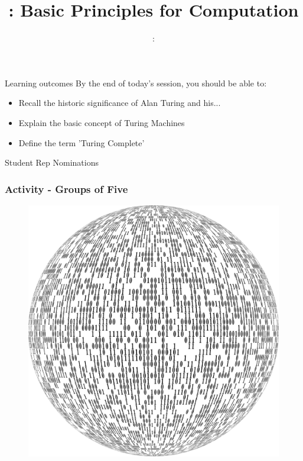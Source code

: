 \usepackage{../../beamerthemeFalmouthGamesAcademy}
\usepackage{multimedia}
\graphicspath{ {../../} }

\lstset{language=Python
}

\usepackage[normalem]{ulem}
\usepackage{wasysym}

\usepackage{pdfpages}

\usetikzlibrary{arrows,automata}




\title{\sessionnumber: Basic Principles for Computation}
\subtitle{\modulecode: \moduletitle}

\frame{\titlepage} 

\begin{frame}{Learning outcomes}
	By the end of today's session, you should be able to:
	\begin{itemize}
		\item Recall the historic significance of Alan Turing and his...
		\item Explain the basic concept of Turing Machines
		\item Define the term 'Turing Complete'
	\end{itemize}
\end{frame}

\begin{frame}
	Student Rep Nominations
\end{frame}

\begin{frame}
	\frametitle{Activity - Groups of Five}
	\begin{figure}
		\includegraphics[scale=0.3]{assets/activity.png}
	\end{figure}
\end{frame}

